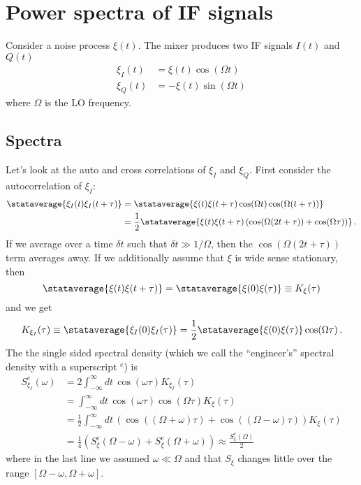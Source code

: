 \section{Power spectra of IF signals}

Consider a noise process $\xi(t)$.
The mixer produces two IF signals $I(t)$ and $Q(t)$
\begin{align}
\xi_I(t) &= \xi(t) \cos(\Omega t) \\
\xi_Q(t) &= -\xi(t) \sin(\Omega t)
\end{align}
where $\Omega$ is the LO frequency.

\subsection{Spectra}

Let's look at the auto and cross correlations of $\xi_I$ and $\xi_Q$.
First consider the autocorrelation of $\xi_I$:
\begin{align}
\stataverage{\xi_I(t) \xi_I(t+\tau)}
&= \stataverage{ \xi(t) \xi(t+\tau) \cos(\Omega t) \cos(\Omega (t + \tau))} \\
&= \frac{1}{2} \stataverage{ \xi(t) \xi(t+\tau) \left( \cos(\Omega (2t + \tau)) + \cos(\Omega \tau) \right) } \, .
\end{align}
If we average over a time $\delta t$ such that $\delta t \gg 1/\Omega$, then the $\cos(\Omega (2t + \tau))$ term averages away.
If we additionally assume that $\xi$ is wide sense stationary, then
\begin{equation}
\stataverage{\xi(t) \xi(t+\tau)} = \stataverage{\xi(0)\xi(\tau)} \equiv K_{\xi}(\tau)
\end{equation}
and we get
\begin{equation}
K_{\xi_I}(\tau) \equiv \stataverage{\xi_I(0) \xi_I(\tau)} = \frac{1}{2} \stataverage{\xi(0)\xi(\tau)} \cos(\Omega \tau) \, .
\end{equation}
The the single sided spectral density (which we call the ``engineer's'' spectral density with a superscript $^e$) is
\begin{align}
S_{\xi_I}^e(\omega)
&= 2 \int_{-\infty}^\infty dt \, \cos(\omega \tau) K_{\xi_I}(\tau) \\
&= \int_{-\infty}^\infty dt \, \cos(\omega \tau) \cos(\Omega \tau) K_{\xi}(\tau) \\
&= \frac{1}{2} \int_{-\infty}^\infty dt \, \left( \cos((\Omega + \omega) \tau) + \cos((\Omega - \omega) \tau) \right) K_{\xi}(\tau) \\
&= \frac{1}{4} \left( S_{\xi}^e(\Omega - \omega) + S_{\xi}^e(\Omega + \omega) \right) \approx \frac{S_{\xi}^e(\Omega)}{2}
\end{align}
where in the last line we assumed $\omega \ll \Omega$ and that $S_{\xi}$ changes little over the range $\left[ \Omega - \omega , \Omega + \omega \right]$.

